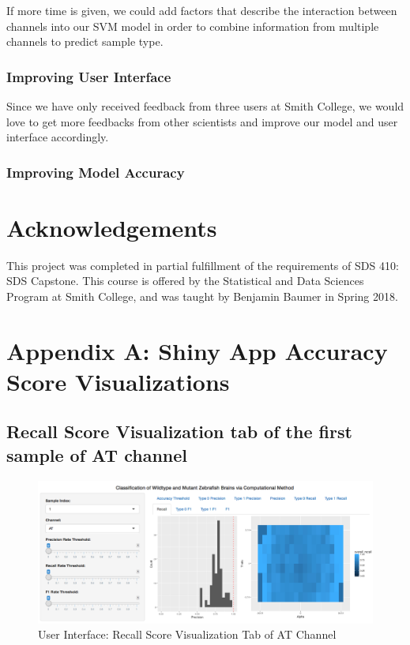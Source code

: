 \documentclass[10pt,letterpaper]{article}
\begin{document}
If more time is given, we could add factors that describe the
interaction between channels into our SVM model in order to combine
information from multiple channels to predict sample type.

\subsubsection{Improving User Interface}\label{improving-user-interface}

Since we have only received feedback from three users at Smith College,
we would love to get more feedbacks from other scientists and improve
our model and user interface accordingly.

\subsubsection{Improving Model Accuracy}\label{improving-model-accuracy}

\section{Acknowledgements}\label{acknowledgements}

This project was completed in partial fulfillment of the requirements of
SDS 410: SDS Capstone. This course is offered by the Statistical and
Data Sciences Program at Smith College, and was taught by Benjamin
Baumer in Spring 2018.

\newpage

\section{Appendix A: Shiny App Accuracy Score
Visualizations}\label{appendix-a-shiny-app-accuracy-score-visualizations}

\subsection{Recall Score Visualization tab of the first sample of AT
channel}\label{recall-score-visualization-tab-of-the-first-sample-of-at-channel}

\begin{figure}[h]

{\centering \includegraphics[width=4.91in]{figures/shiny4} 

}

\caption{User Interface: Recall Score Visualization Tab of AT Channel}\label{fig:shiny4}
\end{figure}
\end{document}
